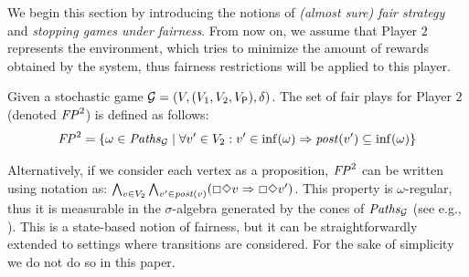 We begin this section by introducing the notions of \emph{(almost sure) fair strategy} and \emph{stopping games under fairness}. 
From now on, we assume that Player $2$ represents the environment,  which tries to minimize the amount of rewards obtained by the system, thus  fairness restrictions will be applied to this player. 

\begin{definition}
   Given a stochastic game $\mathcal{G} = (V, (V_1, V_2, V_{\mathsf{P}}), \delta)$.
The set of fair plays for Player $2$ (denoted $\mathit{FP}^2$) is defined as follows:
\[
	\mathit{FP}^2 = \{ \omega \in \mathit{Paths}_{\mathcal{G}} \mid \forall v' \in V_2: v' \in \inf(\omega)  \Rightarrow \mathit{post}(v') \subseteq \inf(\omega) \}
\]
\end{definition}
	Alternatively,  if we consider each vertex as a proposition,  $\mathit{FP}^2$ can be written using {\LTL} notation as: 
	$\bigwedge_{v \in V_2} \bigwedge_{v' \in \mathit{post}(v)}(\Box \Diamond v \Rightarrow \Box \Diamond v')$.  This property is 	 $\omega$-regular, thus it is measurable  in the $\sigma$-algebra generated by the cones of $\mathit{Paths}_{\mathcal{G}}$ (see e.g., \cite[p.804]{BaierK08}). This is a state-based notion of fairness, but it can be straightforwardly extended to settings where transitions are considered. For the sake of simplicity we do not do so in this paper.
	
	
